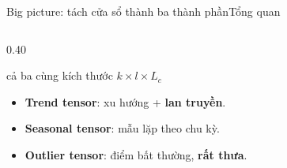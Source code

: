 \begin{frame}{Big picture: tách cửa sổ thành ba thành phần}{Tổng quan}
\begin{columns}[c,onlytextwidth]
\begin{column}{0.40\textwidth}
  \vspace{1mm}
  {\scriptsize\color{DTMuted}cả ba cùng kích thước $k\times l\times L_c$\par}
  \vspace{2mm}
  \begin{itemize}\small
    \item {\color{DTTeal}\textbf{Trend tensor}}: xu hướng + \textbf{lan truyền}.
    \item {\color{DTGold}\textbf{Seasonal tensor}}: mẫu lặp theo chu kỳ.
    \item {\color{DTClaret}\textbf{Outlier tensor}}: điểm bất thường, \textbf{rất thưa}.
  \end{itemize}
\end{column}
\end{columns}
\vfill
{}
\end{frame}

